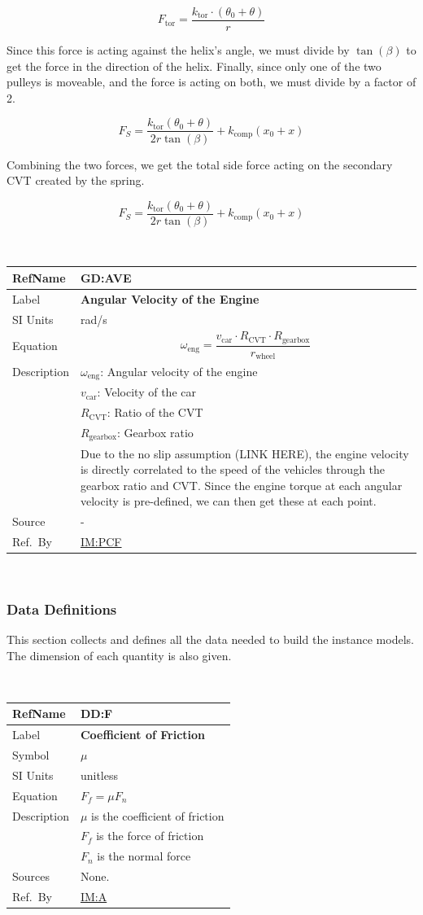 \documentclass[12pt]{article}
\newcommand{\colAwidth}{0.13\textwidth}
\newcommand{\colBwidth}{0.82\textwidth}
\newcommand{\hpref}[1]{\hyperref[#1]{#1}}
\newcommand{\defgeneral}[7] {
~\newline
\noindent
\begin{minipage}{\textwidth}
\renewcommand*{\arraystretch}{1.5}
\begin{tabular}{| p{\colAwidth} | p{\colBwidth}|}
  \hline
  \rowcolor[gray]{0.9}
  RefName& \textbf{#1} \label{#1}\\
  \hline
  Label& \bf #2 \\
  \hline
  SI Units& #3\\
  \hline
  Equation& #4\\
  \hline
  Description& #5 \\
  \hline
  Source& #6 \\
  \hline
  Ref.\ By & #7\\
  \hline
\end{tabular}
\end{minipage}\\
}
\newcommand{\defdata}[8] {
~\newline
\noindent
\begin{minipage}{\textwidth}
\renewcommand*{\arraystretch}{1.5}
\begin{tabular}{| p{\colAwidth} | p{\colBwidth}|}
\hline
\rowcolor[gray]{0.9}
RefName& \textbf{#1} \label{#1}\\
\hline
Label& \bf #2\\
\hline
Symbol & #3\\
\hline
SI Units & #4\\
\hline
Equation& #5\\
\hline
Description & #6\\
\hline
Sources& #7 \\
\hline
Ref.\ By & #8\\
\hline
\end{tabular}
\end{minipage}\\
}
\begin{document}
\[ F_{\text{tor}} = \frac{k_{\text{tor}} \cdot (\theta_0 + \theta)}{r} \]

Since this force is acting against the helix's angle, we must divide by $\tan(\beta)$ to get the force in the direction of the helix. Finally, since only one of the two pulleys is moveable, and the force is acting on both, we must divide by a factor of 2.

\[ F_S = \frac{k_{\text{tor}}(\theta_0 + \theta)}{2r\tan(\beta)} + k_\text{comp}(x_0 + x) \]

Combining the two forces, we get the total side force acting on the secondary CVT created by the spring.

\[ F_S = \frac{k_{\text{tor}}(\theta_0 + \theta)}{2r\tan(\beta)} + k_\text{comp}(x_0 + x) \]

\defgeneral
{GD:AVE}
{Angular Velocity of the Engine} %
{rad/s} %
{
  \[ \omega_\text{eng} = \frac{v_\text{car} \cdot R_{\text{CVT}} \cdot R_\text{gearbox}}{r_\text{wheel}} \]
} %
{ 
$\omega_\text{eng}$: Angular velocity of the engine\\
& $v_\text{car}$: Velocity of the car\\
& $R_{\text{CVT}}$: Ratio of the CVT\\
& $R_\text{gearbox}$: Gearbox ratio\\
& Due to the no slip assumption (LINK HERE), the engine velocity is directly correlated to the speed of the vehicles through the gearbox ratio and CVT. Since the engine torque at each angular velocity is pre-defined, we can then get these at each point.
}  %
{-} %
{\hpref{IM:PCF}} %

\subsubsection{Data Definitions}\label{sec_datadef}

This section collects and defines all the data needed to build the instance
models. The dimension of each quantity is also given. 

\defdata 
{DD:F} %
{Coefficient of Friction} %
{$\mu$} %
{unitless} %
{$F_f = \mu F_n$} %
{$\mu$ is the coefficient of friction\\
& $F_f$ is the force of friction\\
& $F_n$ is the normal force}%
{None.}%
{\hpref{IM:A}}%
\end{document}
